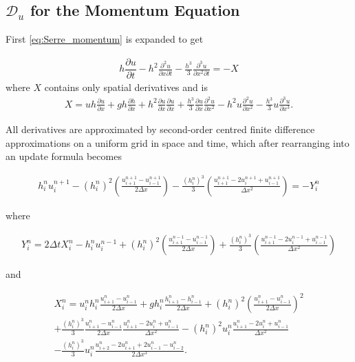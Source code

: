 \documentclass[times]{elsarticle}
\begin{document}
\subsection{$\mathcal{D}_u$ for the Momentum Equation}
First \eqref{eq:Serre_momentum} is expanded to get
\begin{linenomath*}
		\begin{gather*}
		h\dfrac{\partial u}{\partial t} - h^2\frac{\partial^2 u}{\partial x \partial t} - \frac{h^3}{3}\frac{\partial^3 u}{\partial x^2 \partial t}  = -X 
		\label{eq:expandedu}
		\end{gather*}
		where $X$ contains only spatial derivatives and is
		\begin{gather*}
		X = uh\frac{\partial u}{\partial x} + gh\frac{\partial h}{\partial x} + h^2\frac{\partial u}{\partial x}\frac{\partial u}{\partial x} + \frac{h^3}{3}\frac{\partial u}{\partial x}\frac{\partial^2 u}{\partial x^2} - h^2u\frac{\partial^2 u}{\partial x^2}- \frac{h^3}{3}u\frac{\partial^3 u}{\partial x^3} .
		\end{gather*}
\end{linenomath*}
All derivatives are approximated by second-order centred finite difference approximations on a uniform grid in space and time, which after rearranging into an update formula becomes
\begin{linenomath*}
	\begin{gather}
	h^{n}_iu^{n+1}_i - \left(h^{n}_i\right)^2 \left(\frac{u^{n+1}_{i+1} -u^{n+1}_{i-1} }{2 \Delta x}\right) - \frac{\left(h^{n}_i\right)^3}{3}\left(\frac{u^{n+1}_{i+1} - 2u^{n+1}_{i} + u^{n+1}_{i-1} }{\Delta x^2}\right) = - Y^n_i
	\label{eq:expandedutdisc3}
	\end{gather}
\end{linenomath*}
where
\begin{linenomath*}
	\begin{gather*}
	Y_i^n = 2\Delta tX_i^{n} - h_i^{n}u_i^{n-1} + \left(h_i^{n}\right)^2\left(\frac{u^{n-1}_{i+1} -u^{n-1}_{i-1} }{2 \Delta x}\right) + \frac{\left(h_i^{n}\right)^3}{3}\left(\frac{u^{n-1}_{i+1} - 2u^{n-1}_{i} + u^{n-1}_{i-1} }{\Delta x^2}\right)
	\label{eq:expandfactor Xp}
	\end{gather*}
\end{linenomath*}
and
\begin{linenomath*}
\begin{multline*}
X_i^n = u_i^nh_i^n\frac{u^{n}_{i+1} -u^{n}_{i-1} }{2 \Delta x} + gh^n_i\frac{h^{n}_{i+1} -h^{n}_{i-1} }{2 \Delta x} + \left(h^n_i\right)^2\left(\frac{u^{n}_{i+1} -u^{n}_{i-1} }{2 \Delta x} \right)^2  \\ + \frac{\left(h^n_i\right)^3}{3}\frac{u^{n}_{i+1} -u^{n}_{i-1} }{2 \Delta x}\frac{u^{n}_{i+1} - 2u^{n}_{i} + u^{n}_{i-1} }{\Delta x^2} - \left(h^n_i\right)^2u_i^n\frac{u^{n}_{i+1} - 2u^{n}_{i} + u^{n}_{i-1} }{\Delta x^2} \\- \frac{\left(h^n_i\right)^3}{3}u^n_i \frac{u^{n}_{i+2} - 2u^{n}_{i+1} + 2u^{n}_{i-1} - u^{n}_{i-2} }{2\Delta x^3}.
\end{multline*}
\end{linenomath*}
\end{document}
